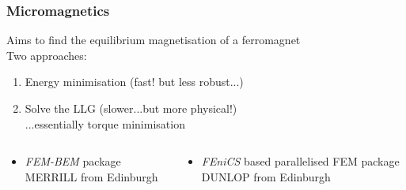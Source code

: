 \documentclass{beamer}
\begin{document}
        \begin{frame}
          \frametitle{Micromagnetics}
          Aims to find the equilibrium magnetisation of a ferromagnet\\
          \color{ImperialNavy}\huge{Two approaches:}
               \begin{enumerate}
                 \item \color{ImperialBlue}\large{Energy minimisation (fast! but less robust...)}
                 \item \color{ImperialBlue}\large{Solve the LLG (slower...but more physical!)}\\
                   ...essentially torque minimisation
               \end{enumerate}
          \begin{columns}
            \begin{column}{0.5\textwidth}
              \begin{itemize}
                \item \textit{FEM-BEM} package \alert{MERRILL} from Edinburgh
              \end{itemize}
            \end{column}
            \begin{column}{0.5\textwidth}
              \begin{itemize}
                \item \textit{FEniCS} based parallelised FEM package \alert{DUNLOP} from Edinburgh
              \end{itemize}
            \end{column}
          \end{columns}
        \end{frame}
\end{document}

